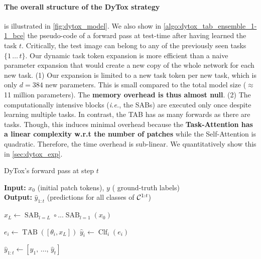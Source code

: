 \paragraph{The overall structure of the DyTox strategy} is illustrated in \autoref{fig:dytox_model}.
We also show in \autoref{algo:dytox_tab_ensemble_1-1_bce} the pseudo-code of a forward pass at test-time
after having learned the task $t$. Critically, the test image can belong to any of the previously
seen tasks $\{1 \,\dots \, t\}$. Our dynamic task token expansion is more efficient than a naive
parameter expansion that would create a new copy of the whole network for each new task. (1) Our
expansion is limited to a new task token per new task, which is only $d=384$ new parameters. This is
small compared to the total model size ($\approx$ 11 million parameters). The \textbf{memory
    overhead is thus almost null}. (2) The computationally intensive blocks (\textit{i.e.}, the SABs)
are executed only once despite learning multiple tasks. In contrast, the TAB has as many forwards as
there are tasks. Though, this induces minimal overhead because the \textbf{Task-Attention has a
    linear complexity w.r.t the number of patches} while the Self-Attention is quadratic. Therefore, the
time overhead is sub-linear. We quantitatively show this in \autoref{sec:dytox_exp}.

\begin{algorithm}[tb]
    \caption{DyTox's forward pass at step $t$}
    \label{algo:dytox_tab_ensemble_1-1_bce}
    \hspace*{\algorithmicindent} \textbf{Input:} $x_0$ (initial patch tokens), $y$ ( ground-truth
    labels) \\
    \hspace*{\algorithmicindent} \textbf{Output:} $\hat{y}_{1:t}$ (predictions for all classes of
    $\mathcal{C}^{1:t}$)
    \begin{algorithmic}[1]
        \State $x_L \gets \operatorname{SAB}_{l=L} \circ ... \operatorname{SAB}_{l=1}(x_0)$

         \State $e_i \gets \operatorname{TAB}([\theta_i,
                x_L])$  \State $\hat{y}_i \gets \operatorname{Clf}_i(e_i)$
         \EndFor

        \State $\hat{y}_{1:t} \gets [\hat{y}_1,\, \dots,\, \hat{y}_{t}]$
    \end{algorithmic}
\end{algorithm}


